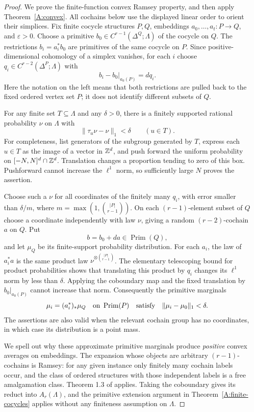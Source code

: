 \begin{proof}
We prove the finite-function convex Ramsey property, and then
apply Theorem~\ref{A:convex}. All cochains below use the displayed
linear order to orient their simplices. Fix finite cocycle
structures $P,Q$, embeddings $a_0,\ldots,a_t:P\to Q$, and
$\varepsilon>0$. Choose a primitive
$b_0\in C^{r-1}(\Delta^Q;\Lambda)$ of the cocycle on $Q$.
The restrictions $b_i=a_i^*b_0$ are primitives of the same
cocycle on $P$. Since positive-dimensional cohomology of a
simplex vanishes, for each $i$ choose
$q_i\in C^{r-2}(\Delta^P;\Lambda)$ with
\[
 b_i-b_0|_{a_0(P)}=d q_i.
\]
Here the notation on the left means that both restrictions are
pulled back to the fixed ordered vertex set $P$; it does not
identify different subsets of $Q$.

For any finite set $T\subseteq\Lambda$ and any $\delta>0$,
there is a finitely supported rational probability $\nu$ on
$\Lambda$ with
\[
 \|\tau_u\nu-\nu\|_1<\delta\qquad(u\in T).
\]
For completeness, list generators of the subgroup generated by
$T$, express each $u\in T$ as the image of a vector in
$\mathbb Z^d$, and push forward the uniform probability on
$[-N,N]^d\cap\mathbb Z^d$. Translation changes a proportion tending
to zero of this box. Pushforward cannot increase the
$\ell^1$ norm, so sufficiently large $N$ proves the assertion.

Choose such a $\nu$ for all coordinates of the finitely many
$q_i$, with error smaller than $\delta/m$, where
$m=\max(1,\binom{|P|}{r-1})$. On each $(r-1)$-element subset
of $Q$ choose a coordinate independently with law $\nu$,
giving a random $(r-2)$-cochain $a$ on $Q$. Put
\[
 b=b_0+d a\in\operatorname{Prim}(Q),
\]
and let $\mu_Q$ be its finite-support probability distribution.
For each $a_i$, the law of $a_i^*a$ is the same product law
$\nu^{\otimes\binom{|P|}{r-1}}$. The elementary telescoping
bound for product probabilities shows that translating this
product by $q_i$ changes its $\ell^1$ norm by less than
$\delta$. Applying the coboundary map and the fixed translation
by $b_0|_{a_0(P)}$ cannot increase that norm. Consequently the
primitive marginals
\[
 \mu_i=(a_i^*)_*\mu_Q\quad\hbox{on }\operatorname{Prim}(P)
 \quad\hbox{satisfy}\quad
 \|\mu_i-\mu_0\|_1<\delta.
\]
The assertions are also valid when the relevant cochain group
has no coordinates, in which case its distribution is a point
mass.

We spell out why these approximate primitive marginals produce
\emph{positive} convex averages on embeddings. The expansion
whose objects are arbitrary $(r-1)$-cochains is Ramsey: for
any given instance only finitely many cochain labels occur,
and the class of ordered structures with those independent
labels is a free amalgamation class. Theorem 1.3 of
\cite{ABEHNFunctions} applies. Taking the coboundary gives its
reduct into $A_r(\Lambda)$, and the primitive extension
argument in Theorem~\ref{A:finite-cocycles} applies without
any finiteness assumption on $\Lambda$.


\end{proof}
